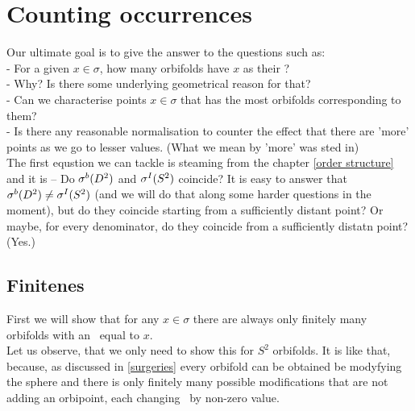 \chapter{Counting occurrences} \label{counting occurrences}
Our ultimate goal is to give the answer to the questions such as: \\
- For a given $x \in \sigma$, how many orbifolds have $x$ as their \Eoc?\\
- Why? Is there some underlying geometrical reason for that?\\
- Can we characterise points $x \in \sigma$ that has the most orbifolds corresponding to them? \\
- Is there any reasonable normalisation to counter the effect that there are 'more' points as we go 
to lesser values. (What we mean by 'more' was sted in) \\
The first equstion we can tackle is steaming from the chapter \ref{order structure} 
and it is -- Do ${\mathcal{\sigma}^b(D^2)}$ and ${\mathcal{\sigma}^I(S^2)}$ coincide? It is easy to answer that ${\mathcal{\sigma}^b(D^2)} \neq {\mathcal{\sigma}^I(S^2)}$ 
(and we will do that along some harder questions in the moment), but do they coincide 
starting from a sufficiently distant point? Or maybe, for every denominator, do they coincide 
from a sufficiently distatn point? (Yes.) \\
\section{Finitenes}
First we will show that for any $x \in \sigma$ there are always only finitely many orbifolds 
with an \Eoc\ equal to $x$. \\ 
Let us observe, that we only need to show this for $S^2$ orbifolds. It is like that, because, 
as discussed in \ref{surgeries} every orbifold can be obtained be modyfying the sphere and 
there is only finitely many possible modifications that are not adding an orbipoint, each 
changing \Eoc\ by non-zero value. \\ 

